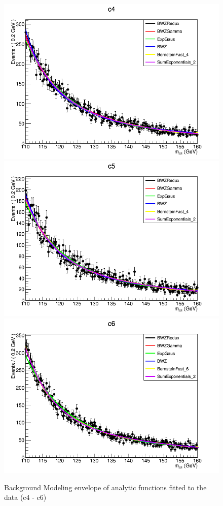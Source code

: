 \begin{figure}[hbp]
  \centering
  \includegraphics[width=0.65\linewidth]{figures/ch_higgs/backgroundmodel/uf_bdt/backgroundFits__c4__bkgModels.png}\\
  \includegraphics[width=0.65\linewidth]{figures/ch_higgs/backgroundmodel/uf_bdt/backgroundFits__c5__bkgModels.png}\\
  \includegraphics[width=0.65\linewidth]{figures/ch_higgs/backgroundmodel/uf_bdt/backgroundFits__c6__bkgModels.png}
  \caption{Background Modeling envelope of analytic functions fitted to the data (c4 - c6)}
  \label{fig:higgs_bmodel_bdtc4c6}
\end{figure}
